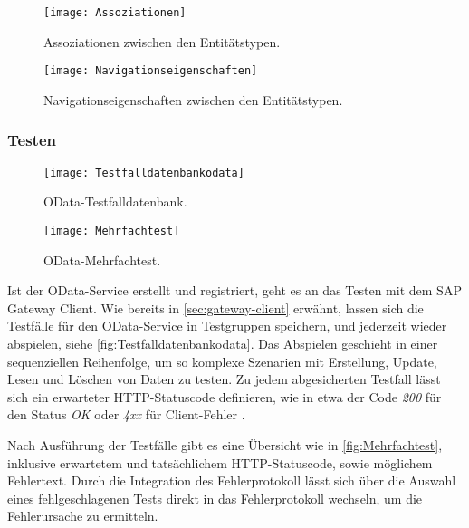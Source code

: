 \begin{figure}[h]
	\centering
	\texttt{[image: Assoziationen]} 
	\caption[Entitätstypen -- Assoziationen]{Assoziationen zwischen den Entitätstypen.}
	\label{fig:Assoziationen}
\end{figure}


\begin{figure}[h]
	\centering
	\texttt{[image: Navigationseigenschaften]} 
	\caption[Entitätstypen -- Navigationseigenschaften]{Navigationseigenschaften zwischen den Entitätstypen.}
	\label{fig:Navigationseigenschaften}
\end{figure}


\subsubsection{Testen}

\begin{figure}
	\centering
	\texttt{[image: Testfalldatenbankodata]} 
	\caption[OData-Testfalldatenbank]{OData-Testfalldatenbank.}
	\label{fig:Testfalldatenbankodata}
\end{figure}


\begin{figure}
	\centering
	\texttt{[image: Mehrfachtest]} 
	\caption[OData-Mehrfachtest]{OData-Mehrfachtest.}
	\label{fig:Mehrfachtest}
\end{figure}

Ist der OData-Service erstellt und registriert, geht es an das Testen mit dem SAP Gateway Client. Wie bereits in \autoref{sec:gateway-client} erwähnt, lassen sich die Testfälle für den OData-Service in Testgruppen speichern, und jederzeit wieder abspielen, siehe \autoref{fig:Testfalldatenbankodata}. Das Abspielen geschieht in einer sequenziellen Reihenfolge, um so komplexe Szenarien mit Erstellung, Update, Lesen und Löschen von Daten zu testen. Zu jedem abgesicherten Testfall lässt sich ein erwarteter HTTP-Statuscode definieren, wie in etwa der Code \textit{200} für den Status \textit{OK} oder \textit{4xx} für Client-Fehler \cite[S.\ 555-556]{BoennenDreesFischerHeinzStrothmann2014}.


Nach Ausführung der Testfälle gibt es eine Übersicht wie in \autoref{fig:Mehrfachtest}, inklusive erwartetem und tatsächlichem HTTP-Statuscode, sowie möglichem Fehlertext. Durch die Integration des Fehlerprotokoll lässt sich über die Auswahl eines fehlgeschlagenen Tests direkt in das Fehlerprotokoll wechseln, um die Fehlerursache zu ermitteln. 

